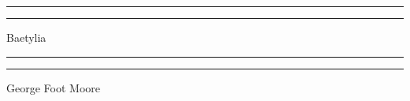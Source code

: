 \documentclass[a4paper, 12pt, oneside, polutonikogreek, english]{article}
\begin{document}
\renewcommand{\thefigure}{\Fontauri{\arabic{figure}}}
\renewcommand\thefootnote{\Fontauri{\arabic{footnote}}}
\let\oldfootnote\footnote
    \renewcommand{\footnote}[1]{\oldfootnote{\Fontauri\large#1}}
\begin{titlepage} %
	\centering %
	\scshape %

	
	\rule{\textwidth}{1.6pt}\vspace*{-\baselineskip}\vspace*{2pt} %
	\rule{\textwidth}{0.4pt} %
	
	\vspace{0.75\baselineskip} %

        {\Huge Baetylia} %
	
	\vspace{0.75\baselineskip} %
	
	\rule{\textwidth}{0.4pt}\vspace*{-\baselineskip}\vspace{3.2pt} %
	\rule{\textwidth}{1.6pt} %
	
	\vspace{1\baselineskip} %
	
	
	{\large George Foot Moore} %
	
	\vspace*{1\baselineskip} %
	
	
	\vspace{1\baselineskip} %

	
	
		

\end{titlepage}
\end{document}
